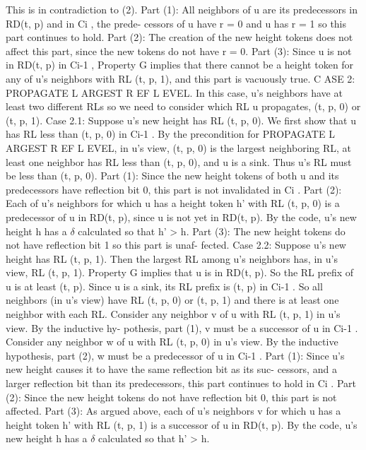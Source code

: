 This is in contradiction to (2). Part (1): All neighbors of u are its predecessors in RD(t, p) and in Ci , the prede- cessors of u have r = 0 and u has r = 1 so this part continues to hold. Part (2): The creation of the new height tokens does not affect this part, since the new tokens do not have r = 0. Part (3): Since u is not in RD(t, p) in Ci-1 , Property G implies that there cannot be a height token for any of u's neighbors with RL (t, p, 1), and this part is vacuously true. C ASE 2: PROPAGATE L ARGEST R EF L EVEL. In this case, u's neighbors have at least two different RLs so we need to consider which RL u propagates, (t, p, 0) or (t, p, 1).
Case 2.1: Suppose u's new height has RL (t, p, 0). We first show that u has RL less than (t, p, 0) in Ci-1 . By the precondition for PROPAGATE L ARGEST R EF L EVEL, in u's view, (t, p, 0) is the largest neighboring RL, at least one neighbor has RL less than (t, p, 0), and u is a sink. Thus u's RL must be less than (t, p, 0). Part (1): Since the new height tokens of both u and its predecessors have reflection bit 0, this part is not invalidated in Ci . Part (2): Each of u's neighbors for which u has a height token h' with RL (t, p, 0) is a predecessor of u in RD(t, p), since u is not yet in RD(t, p). By the code, u's new height h has a $\delta$ calculated so that h' > h. Part (3): The new height tokens do not have reflection bit 1 so this part is unaf- fected. Case 2.2: Suppose u's new height has RL (t, p, 1). Then the largest RL among u's neighbors has, in u's view, RL (t, p, 1). Property G implies that u is in RD(t, p). So the RL prefix of u is at least (t, p). Since u is a sink, its RL prefix is (t, p) in Ci-1 . So all neighbors (in u's view) have RL (t, p, 0) or (t, p, 1) and there is at least one neighbor with each RL. Consider any neighbor v of u with RL (t, p, 1) in u's view. By the inductive hy- pothesis, part (1), v must be a successor of u in Ci-1 . Consider any neighbor w of u with RL (t, p, 0) in u's view. By the inductive hypothesis, part (2), w must be a predecessor of u in Ci-1 . Part (1): Since u's new height causes it to have the same reflection bit as its suc- cessors, and a larger reflection bit than its predecessors, this part continues to hold in Ci . Part (2): Since the new height tokens do not have reflection bit 0, this part is not affected. Part (3): As argued above, each of u's neighbors v for which u has a height token h' with RL (t, p, 1) is a successor of u in RD(t, p). By the code, u's new height h has a $\delta$ calculated so that h' > h.
